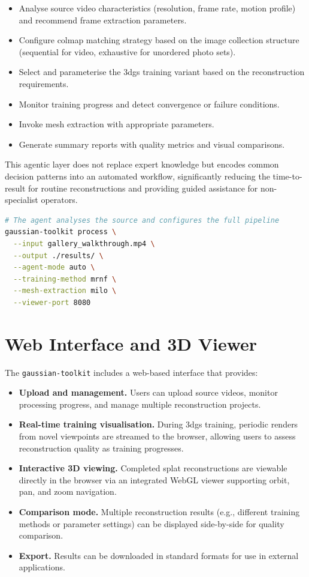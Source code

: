 \begin{itemize}
  \item Analyse source video characteristics (resolution, frame rate, motion profile) and recommend frame extraction parameters.
  \item Configure \acrshort{colmap} matching strategy based on the image collection structure (sequential for video, exhaustive for unordered photo sets).
  \item Select and parameterise the \acrshort{3dgs} training variant based on the reconstruction requirements.
  \item Monitor training progress and detect convergence or failure conditions.
  \item Invoke mesh extraction with appropriate parameters.
  \item Generate summary reports with quality metrics and visual comparisons.
\end{itemize}

This agentic layer does not replace expert knowledge but encodes common decision patterns into an automated workflow, significantly reducing the time-to-result for routine reconstructions and providing guided assistance for non-specialist operators.

\begin{lstlisting}[language=bash, caption={Example agentic invocation of the pipeline.}, label={lst:agent-invoke}]
# The agent analyses the source and configures the full pipeline
gaussian-toolkit process \
  --input gallery_walkthrough.mp4 \
  --output ./results/ \
  --agent-mode auto \
  --training-method mrnf \
  --mesh-extraction milo \
  --viewer-port 8080
\end{lstlisting}

\section{Web Interface and 3D Viewer}
\label{sec:pipe-viewer}

The \texttt{gaussian-toolkit} includes a web-based interface that provides:

\begin{itemize}
  \item \textbf{Upload and management.} Users can upload source videos, monitor processing progress, and manage multiple reconstruction projects.
  \item \textbf{Real-time training visualisation.} During \acrshort{3dgs} training, periodic renders from novel viewpoints are streamed to the browser, allowing users to assess reconstruction quality as training progresses.
  \item \textbf{Interactive 3D viewing.} Completed splat reconstructions are viewable directly in the browser via an integrated WebGL viewer supporting orbit, pan, and zoom navigation.
  \item \textbf{Comparison mode.} Multiple reconstruction results (e.g., different training methods or parameter settings) can be displayed side-by-side for quality comparison.
  \item \textbf{Export.} Results can be downloaded in standard formats for use in external applications.
\end{itemize}

